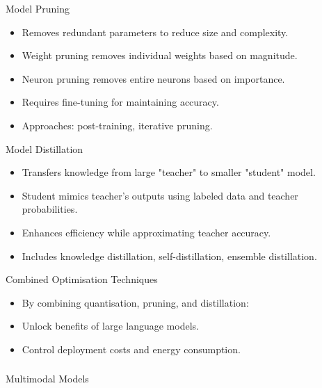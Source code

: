 \begin{frame}[fragile]{Model Pruning}
  \begin{itemize}
    \item Removes redundant parameters to reduce size and complexity.
    \item Weight pruning removes individual weights based on magnitude.
    \item Neuron pruning removes entire neurons based on importance.
    \item Requires fine-tuning for maintaining accuracy.
    \item Approaches: post-training, iterative pruning.
  \end{itemize}
\end{frame}

\begin{frame}[fragile]{Model Distillation}
  \begin{itemize}
    \item Transfers knowledge from large "teacher" to smaller "student" model.
    \item Student mimics teacher's outputs using labeled data and teacher probabilities.
    \item Enhances efficiency while approximating teacher accuracy.
    \item Includes knowledge distillation, self-distillation, ensemble distillation.
  \end{itemize}
\end{frame}

\begin{frame}[fragile]{Combined Optimisation Techniques}
  \begin{itemize}
    \item By combining quantisation, pruning, and distillation:
    \item Unlock benefits of large language models.
    \item Control deployment costs and energy consumption.
  \end{itemize}
\end{frame}


\begin{frame}[fragile]\frametitle{}
\begin{center}
{\Large Multimodal Models}
\end{center}
\end{frame}


